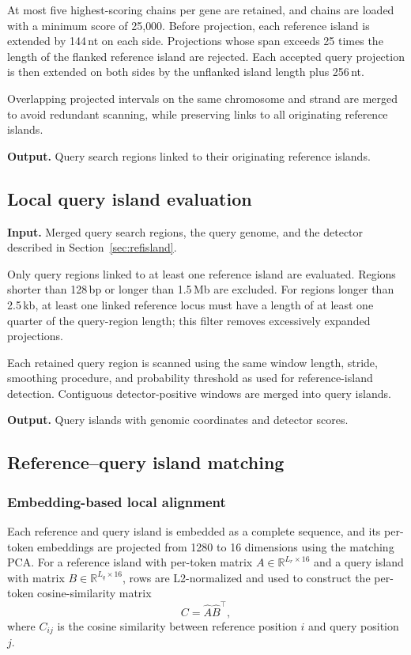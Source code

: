 At most five highest-scoring chains per gene are retained, and chains are loaded
with a minimum score of 25{,}000. Before projection, each reference island is
extended by 144\,nt on each side. Projections whose span exceeds 25 times the
length of the flanked reference island are rejected. Each accepted query
projection is then extended on both sides by the unflanked island length plus
256\,nt.

Overlapping projected intervals on the same chromosome and strand are merged to
avoid redundant scanning, while preserving links to all originating reference
islands.

\textbf{Output.} Query search regions linked to their originating reference
islands.

\subsection{Local query island evaluation}
\label{sec:queryisland}

\textbf{Input.} Merged query search regions, the query genome, and the detector
described in Section~\ref{sec:refisland}.

Only query regions linked to at least one reference island are evaluated.
Regions shorter than 128\,bp or longer than 1.5\,Mb are excluded. For regions
longer than 2.5\,kb, at least one linked reference locus must have a length of at
least one quarter of the query-region length; this filter removes excessively
expanded projections.

Each retained query region is scanned using the same window length, stride,
smoothing procedure, and probability threshold as used for reference-island
detection. Contiguous detector-positive windows are merged into query islands.

\textbf{Output.} Query islands with genomic coordinates and detector scores.

\subsection{Reference--query island matching}
\label{sec:islandalign}

\subsubsection{Embedding-based local alignment}

Each reference and query island is embedded as a complete sequence, and its
per-token embeddings are projected from 1280 to 16 dimensions using the matching
PCA. For a reference island with per-token matrix
$A \in \mathbb{R}^{L_r \times 16}$ and a query island with matrix
$B \in \mathbb{R}^{L_q \times 16}$, rows are L2-normalized and used to construct
the per-token cosine-similarity matrix
\[
    C = \hat{A}\hat{B}^{\top},
\]
where $C_{ij}$ is the cosine similarity between reference position $i$ and query
position $j$.

